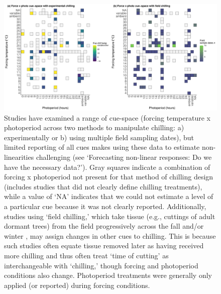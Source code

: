 \documentclass[11pt,letter]{article}
\begin{document}
\clearpage
\begin{figure}[t!]
\centering
\includegraphics[width=1.1\textwidth]{..//..//analyses/limitingcues/figures/heatmapphotoxforcexchill2panel.pdf}
\caption{Studies have examined a range of cue-space (forcing temperature x photoperiod across two methods to manipulate chilling: a) experimentally or b) using multiple field sampling dates), but limited reporting of all cues makes using these data to estimate non-linearities challenging (see `Forecasting non-linear responses: Do we have the necessary data?'). Gray squares indicate a combination of forcing x photoperiod not present for that method of chilling design (includes studies that did not clearly define chilling treatments), while a value of `NA' indicates that we could not estimate a level of a particular cue because it was not clearly reported. Additionally, studies using `field chilling,' which take tissue (e.g., cuttings of adult dormant trees) from the field progressively across the fall and/or winter \citep[see][]{weinberger1950}, may assign changes in other cues to chilling. This is because such studies often equate tissue removed later as having received more chilling and thus often treat `time of cutting' as interchangeable with `chilling,'  though forcing and photoperiod conditions also change. Photoperiod treatments were generally only applied (or reported) during forcing conditions.}
  \label{fig:heatmaps} 
\end{figure}

\clearpage
\end{document}
